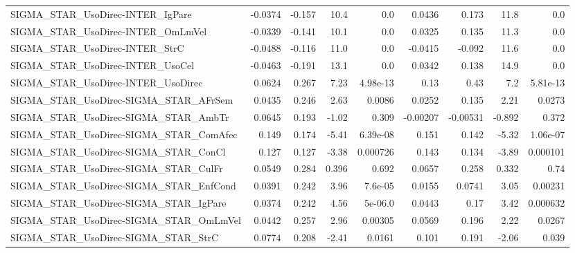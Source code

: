 \begin{tabular}{lrrrrrrrr}
SIGMA\_STAR\_UsoDirec-INTER\_IgPare       &     -0.0374 &       -0.157 &     10.4 &      0.0 &     0.0436 &       0.173 &         11.8 &           0.0 \\
SIGMA\_STAR\_UsoDirec-INTER\_OmLmVel      &     -0.0339 &       -0.141 &     10.1 &      0.0 &     0.0325 &       0.135 &         11.3 &           0.0 \\
SIGMA\_STAR\_UsoDirec-INTER\_StrC         &     -0.0488 &       -0.116 &     11.0 &      0.0 &    -0.0415 &      -0.092 &         11.6 &           0.0 \\
SIGMA\_STAR\_UsoDirec-INTER\_UsoCel       &     -0.0463 &       -0.191 &     13.1 &      0.0 &     0.0342 &       0.138 &         14.9 &           0.0 \\
SIGMA\_STAR\_UsoDirec-INTER\_UsoDirec     &      0.0624 &        0.267 &     7.23 & 4.98e-13 &       0.13 &        0.43 &          7.2 &      5.81e-13 \\
SIGMA\_STAR\_UsoDirec-SIGMA\_STAR\_AFrSem  &      0.0435 &        0.246 &     2.63 &   0.0086 &     0.0252 &       0.135 &         2.21 &        0.0273 \\
SIGMA\_STAR\_UsoDirec-SIGMA\_STAR\_AmbTr   &      0.0645 &        0.193 &    -1.02 &    0.309 &   -0.00207 &    -0.00531 &       -0.892 &         0.372 \\
SIGMA\_STAR\_UsoDirec-SIGMA\_STAR\_ComAfec &       0.149 &        0.174 &    -5.41 & 6.39e-08 &      0.151 &       0.142 &        -5.32 &      1.06e-07 \\
SIGMA\_STAR\_UsoDirec-SIGMA\_STAR\_ConCl   &       0.127 &        0.127 &    -3.38 & 0.000726 &      0.143 &       0.134 &        -3.89 &      0.000101 \\
SIGMA\_STAR\_UsoDirec-SIGMA\_STAR\_CulFr   &      0.0549 &        0.284 &    0.396 &    0.692 &     0.0657 &       0.258 &        0.332 &          0.74 \\
SIGMA\_STAR\_UsoDirec-SIGMA\_STAR\_EnfCond &      0.0391 &        0.242 &     3.96 &  7.6e-05 &     0.0155 &      0.0741 &         3.05 &       0.00231 \\
SIGMA\_STAR\_UsoDirec-SIGMA\_STAR\_IgPare  &      0.0374 &        0.242 &     4.56 &  5e-06.0 &     0.0443 &        0.17 &         3.42 &      0.000632 \\
SIGMA\_STAR\_UsoDirec-SIGMA\_STAR\_OmLmVel &      0.0442 &        0.257 &     2.96 &  0.00305 &     0.0569 &       0.196 &         2.22 &        0.0267 \\
SIGMA\_STAR\_UsoDirec-SIGMA\_STAR\_StrC    &      0.0774 &        0.208 &    -2.41 &   0.0161 &      0.101 &       0.191 &        -2.06 &         0.039 \\

\end{tabular}
